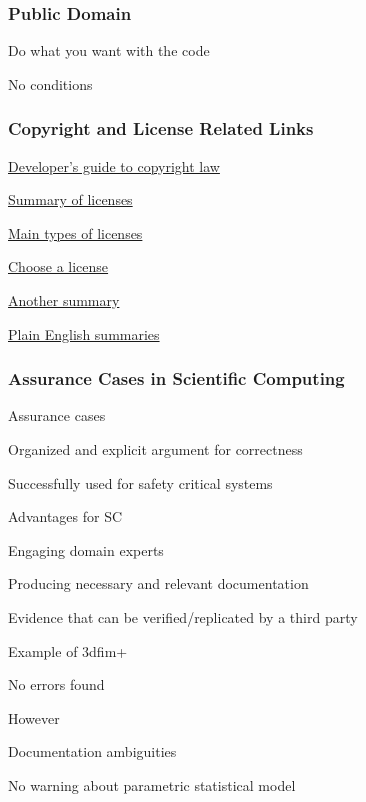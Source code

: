 \documentclass[t,12pt,numbers,fleqn]{beamer}
\begin{document}

\begin{frame}
\frametitle{Public Domain}

\bi
\item Do what you want with the code
\item No conditions
\ei

\end{frame}


\begin{frame}
\frametitle{Copyright and License Related Links}

\bi
\item
  \href{http://haacked.com/archive/2006/01/24/TheDevelopersGuideToCopyrightLaw-Part1.aspx/}{Developer's
    guide to copyright law}

\item \href{https://www.smashingmagazine.com/2010/03/a-short-guide-to-open-source-and-similar-licenses/}{Summary of licenses}

\item
  \href{http://haacked.com/archive/2007/04/04/there-are-only-four-software-licenses.aspx/}{Main
    types of licenses}

\item \href{http://choosealicense.com}{Choose a license}
\item \href{http://choosealicense.com/licenses/}{Another summary}
\item \href{https://tldrlegal.com}{Plain English summaries}

\ei

\end{frame}


\begin{frame}
\frametitle{Assurance Cases in Scientific Computing \cite{SmithEtAl2017}}

\bi
\item Assurance cases
\bi 
\item Organized and explicit argument for correctness
\item Successfully used for safety critical systems
\ei
\item Advantages for SC
\bi
\item Engaging domain experts
\item Producing necessary and relevant documentation
\item Evidence that can be verified/replicated by a third party
\ei
\item Example of 3dfim+
\bi
\item No errors found
\item However
\bi
\item Documentation ambiguities
\item No warning about parametric statistical model
\ei
\ei
\ei

\end{frame}
\end{document}

